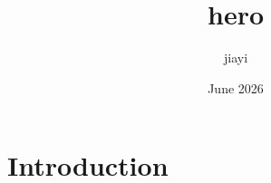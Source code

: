 \documentclass{article}
\title{hero}
\author{jiayi }
\date{June 2026}
\begin{document}
\maketitle

\section{Introduction}
\end{document}
